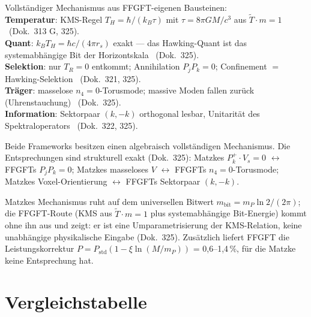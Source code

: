 \begin{tcolorbox}[ffgftbox, title={FFGFT (Dok.\ 325)}]
  Vollständiger Mechanismus aus FFGFT-eigenen Bausteinen:\\
  \textbf{Temperatur}: KMS-Regel $T_H = \hbar/(k_B\tau)$ mit
  $\tau = 8\pi GM/c^3$ aus $\tilde{T}\cdot m = 1$ \K\ (Dok.\ 313 G, 325).\\
  \textbf{Quant}: $k_B T_H = \hbar c/(4\pi r_s)$ exakt — das Hawking-Quant
  ist das systemabhängige Bit der Horizontskala \K\ (Dok.\ 325).\\
  \textbf{Selektion}: nur $T_R = 0$ entkommt; Annihilation
  $P_jP_k = 0$; Confinement $=$ Hawking-Selektion \B\ (Dok.\ 321, 325).\\
  \textbf{Träger}: masselose $n_4 = 0$-Torusmode; massive Moden
  fallen zurück (Uhrenstauchung) \K\ (Dok.\ 325).\\
  \textbf{Information}: Sektorpaar $(k,-k)$ orthogonal lesbar,
  Unitarität des Spektraloperators \K\ (Dok.\ 322, 325).
\end{tcolorbox}

\begin{tcolorbox}[convbox, title={Konvergenz — zwei vollständige Mechanismen}]
  Beide Frameworks besitzen einen algebraisch vollständigen Mechanismus.
  Die Entsprechungen sind strukturell exakt (Dok.\ 325):
  Matzkes $P_k^+\cdot V_s = 0$ $\leftrightarrow$ FFGFTs $P_jP_k = 0$;
  Matzkes masseloses $V$ $\leftrightarrow$ FFGFTs $n_4=0$-Torusmode;
  Matzkes Voxel-Orientierung $\leftrightarrow$ FFGFTs Sektorpaar $(k,-k)$.
\end{tcolorbox}

\begin{tcolorbox}[divbox, title={Divergenz — die Bitwert-Grundlegung}]
  Matzkes Mechanismus ruht auf dem universellen Bitwert
  $m_{\mathrm{bit}} = m_P\ln 2/(2\pi)$; die FFGFT-Route (KMS aus
  $\tilde{T}\cdot m=1$ plus systemabhängige Bit-Energie) kommt ohne
  ihn aus und zeigt: er ist eine Umparametrisierung der KMS-Relation,
  keine unabhängige physikalische Eingabe (Dok.\ 325).
  Zusätzlich liefert FFGFT die Leistungskorrektur
  $P = P_{\mathrm{std}}(1-\xi\ln(M/m_P))$ = 0{,}6–1{,}4\,\%,
  für die Matzke keine Entsprechung hat.
\end{tcolorbox}

\section{Vergleichstabelle}

